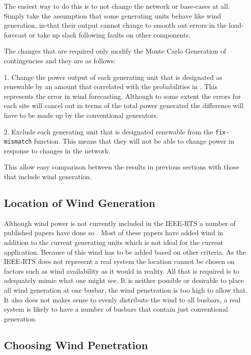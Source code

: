 \documentclass[a4paper,oneside,12pt]{report}
\begin{document}
The easiest way to do this is to not change the network or base-cases at all. Simply take the assumption that some generating units behave like wind generation, in-that their output cannot change to smooth out errors in the load-forecast or take up slack following faults on other components. 

The changes that are required only modify the Monte Carlo Generation of contingencies and they are as follows: 

1. Change the power output of each generating unit that is designated as renewable by an amount that correlated with the probabilities in \cite{Bathurst2002}. This represents the error in wind forecasting. Although to some extent the errors for each site will cancel out in terms of the total power generated the difference will have to be made up by the conventional generators.

2. Exclude each generating unit that is designated renewable from the \texttt{fix-mismatch} function. This means that they will not be able to change power in response to changes in the network. 

This allow easy comparison between the results in previous sections with those that include wind generation. 

\subsection{Location of Wind Generation}

Although wind power is not currently included in the IEEE-RTS a number of published papers have done so \cite{XXX XXX}. Most of these papers have added wind in addition to the current generating units which is not ideal for the current application. Because of this wind has to be added based on other criteria. As the IEEE-RTS does not represent a real system the location cannot be chosen on factors such as wind availability as it would in reality. All that is required is to adequately mimic what one might see. It is neither possible or desirable to place all wind generation at one busbar, the wind penetration is too high to allow that. It also does not makes sense to evenly distribute the wind to all busbars, a real system is likely to have a number of busbars that contain just conventional generation.

\subsection{Choosing Wind Penetration}
\end{document}
